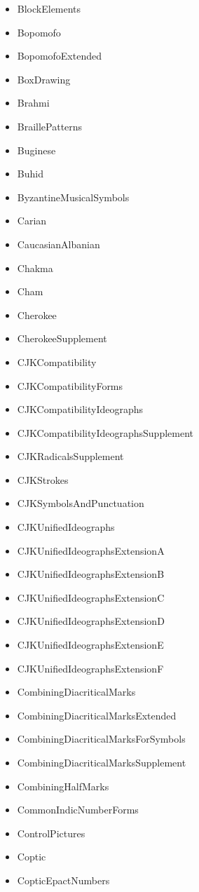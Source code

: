 ﻿\documentclass{article}
\newenvironment{itemlist}{%
  \begin{itemize}
	\setlength{\itemsep}{0pt}
	\setlength{\parsep}{0pt}
	\setlength{\topsep}{0pt}
	\setlength{\partopsep}{0pt}
	\setlength{\parskip}{0pt}
	\setlength{\labelsep}{5pt}}%
{
  \end{itemize}}
\begin{document}
\begin{multicols}{2}
\begin{itemlist}
				\item BlockElements
				\item Bopomofo
				\item BopomofoExtended
				\item BoxDrawing
				\item Brahmi
				\item BraillePatterns
				\item Buginese
				\item Buhid
				\item ByzantineMusicalSymbols
				\item Carian
				\item CaucasianAlbanian
				\item Chakma
				\item Cham
				\item Cherokee
				\item CherokeeSupplement
				\item CJKCompatibility
				\item CJKCompatibilityForms
				\item CJKCompatibilityIdeographs
				\item CJKCompatibilityIdeographsSupplement
				\item CJKRadicalsSupplement
				\item CJKStrokes
				\item CJKSymbolsAndPunctuation
				\item CJKUnifiedIdeographs
				\item CJKUnifiedIdeographsExtensionA
				\item CJKUnifiedIdeographsExtensionB
				\item CJKUnifiedIdeographsExtensionC
				\item CJKUnifiedIdeographsExtensionD
				\item CJKUnifiedIdeographsExtensionE
				\item CJKUnifiedIdeographsExtensionF
				\item CombiningDiacriticalMarks
				\item CombiningDiacriticalMarksExtended
				\item CombiningDiacriticalMarksForSymbols
				\item CombiningDiacriticalMarksSupplement
				\item CombiningHalfMarks
				\item CommonIndicNumberForms
				\item ControlPictures
				\item Coptic
				\item CopticEpactNumbers

\end{itemlist}
\end{multicols}
\end{document}
